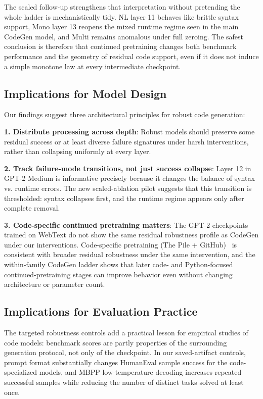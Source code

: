 \documentclass[preprint,12pt,authoryear]{elsarticle}
\begin{document}
The scaled follow-up strengthens that interpretation without pretending the whole ladder is mechanistically tidy. NL layer 11 behaves like brittle syntax support, Mono layer 13 reopens the mixed runtime regime seen in the main CodeGen model, and Multi remains anomalous under full zeroing. The safest conclusion is therefore that continued pretraining changes both benchmark performance and the geometry of residual code support, even if it does not induce a simple monotone law at every intermediate checkpoint.

\subsection{Implications for Model Design}

Our findings suggest three architectural principles for robust code generation:

\textbf{1. Distribute processing across depth}: Robust models should preserve some residual success or at least diverse failure signatures under harsh interventions, rather than collapsing uniformly at every layer.

\textbf{2. Track failure-mode transitions, not just success collapse}: Layer 12 in GPT-2 Medium is informative precisely because it changes the balance of syntax vs. runtime errors. The new scaled-ablation pilot suggests that this transition is thresholded: syntax collapses first, and the runtime regime appears only after complete removal.

\textbf{3. Code-specific continued pretraining matters}: The GPT-2 checkpoints trained on WebText do not show the same residual robustness profile as CodeGen under our interventions. Code-specific pretraining (The Pile + GitHub)~\cite{gao2021pile,nijkamp2022codegen} is consistent with broader residual robustness under the same intervention, and the within-family CodeGen ladder shows that later code- and Python-focused continued-pretraining stages can improve behavior even without changing architecture or parameter count.

\subsection{Implications for Evaluation Practice}

The targeted robustness controls add a practical lesson for empirical studies of code models: benchmark scores are partly properties of the surrounding generation protocol, not only of the checkpoint. In our saved-artifact controls, prompt format substantially changes HumanEval sample success for the code-specialized models, and MBPP low-temperature decoding increases repeated successful samples while reducing the number of distinct tasks solved at least once.
\end{document}
